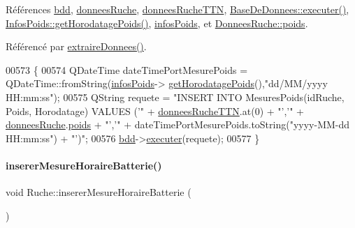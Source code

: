 Références \hyperlink{class_ruche_a8577fdedabdecd98652e338e83bb3b65}{bdd}, \hyperlink{class_ruche_a1526bfa78f03e0710ad16f880a40c15f}{donnees\+Ruche}, \hyperlink{class_ruche_a4556832042641c08a6ef2ab9d80d771e}{donnees\+Ruche\+T\+TN}, \hyperlink{class_base_de_donnees_aa8de5f8f8bb17edc43f5c0ee33712081}{Base\+De\+Donnees\+::executer()}, \hyperlink{class_infos_poids_a9bd9ffa1a5fcd75a8d75bd7330727620}{Infos\+Poids\+::get\+Horodatage\+Poids()}, \hyperlink{class_ruche_af3d02b62dd3d986b73b38851bb88ec77}{infos\+Poids}, et \hyperlink{struct_donnees_ruche_af825ee2a3638e519d531c62311592d20}{Donnees\+Ruche\+::poids}.



Référencé par \hyperlink{class_ruche_a21c0dafeaec03d451590037343e6a3ca}{extraire\+Donnees()}.


\begin{DoxyCode}
00573 \{
00574     QDateTime dateTimePortMesurePoids = QDateTime::fromString(\hyperlink{class_ruche_af3d02b62dd3d986b73b38851bb88ec77}{infosPoids}->
      \hyperlink{class_infos_poids_a9bd9ffa1a5fcd75a8d75bd7330727620}{getHorodatagePoids}(),\textcolor{stringliteral}{"dd/MM/yyyy HH:mm:ss"});
00575     QString requete = \textcolor{stringliteral}{"INSERT INTO MesuresPoids(idRuche, Poids, Horodatage) VALUES ('"} + 
      \hyperlink{class_ruche_a4556832042641c08a6ef2ab9d80d771e}{donneesRucheTTN}.at(0) + \textcolor{stringliteral}{"','"}  + \hyperlink{class_ruche_a1526bfa78f03e0710ad16f880a40c15f}{donneesRuche}.\hyperlink{struct_donnees_ruche_af825ee2a3638e519d531c62311592d20}{poids} + \textcolor{stringliteral}{"','"} + 
      dateTimePortMesurePoids.toString(\textcolor{stringliteral}{"yyyy-MM-dd  HH:mm:ss"}) + \textcolor{stringliteral}{"')"};
00576     \hyperlink{class_ruche_a8577fdedabdecd98652e338e83bb3b65}{bdd}->\hyperlink{class_base_de_donnees_aa8de5f8f8bb17edc43f5c0ee33712081}{executer}(requete);
00577 \}
\end{DoxyCode}
\mbox{\label{class_ruche_a4af7e7c209b2267daf1f640cb53020e2}} 
\paragraph{\texorpdfstring{inserer\+Mesure\+Horaire\+Batterie()}{insererMesureHoraireBatterie()}}
{\footnotesize\ttfamily void Ruche\+::inserer\+Mesure\+Horaire\+Batterie (\begin{DoxyParamCaption}{ }\end{DoxyParamCaption})\hspace{0.3cm}{\ttfamily [private]}}



